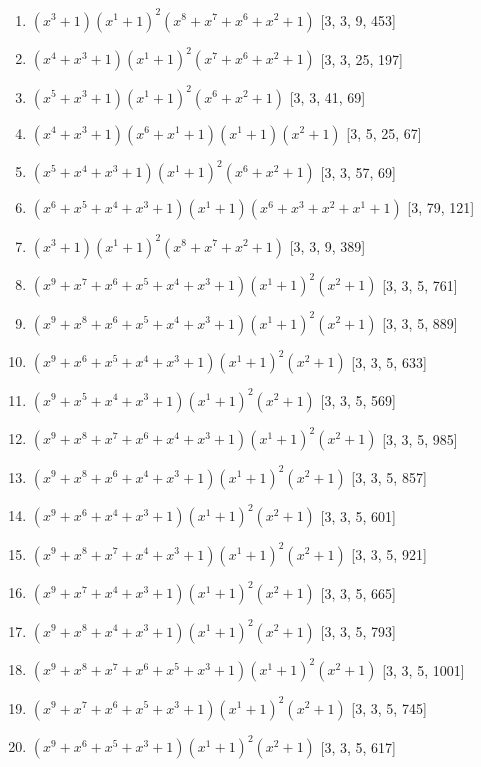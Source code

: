 \documentclass[10pt,twocolumn]{article}
\begin{document}
\begin{enumerate}
\item $(x^{3} + 1)(x^{1} + 1)^{2}(x^{8} + x^{7} + x^{6} + x^{2} + 1)$  [3, 3, 9, 453]
\item $(x^{4} + x^{3} + 1)(x^{1} + 1)^{2}(x^{7} + x^{6} + x^{2} + 1)$  [3, 3, 25, 197]
\item $(x^{5} + x^{3} + 1)(x^{1} + 1)^{2}(x^{6} + x^{2} + 1)$  [3, 3, 41, 69]
\item $(x^{4} + x^{3} + 1)(x^{6} + x^{1} + 1)(x^{1} + 1)(x^{2} + 1)$  [3, 5, 25, 67]
\item $(x^{5} + x^{4} + x^{3} + 1)(x^{1} + 1)^{2}(x^{6} + x^{2} + 1)$  [3, 3, 57, 69]
\item $(x^{6} + x^{5} + x^{4} + x^{3} + 1)(x^{1} + 1)(x^{6} + x^{3} + x^{2} + x^{1} + 1)$  [3, 79, 121]
\item $(x^{3} + 1)(x^{1} + 1)^{2}(x^{8} + x^{7} + x^{2} + 1)$  [3, 3, 9, 389]
\item $(x^{9} + x^{7} + x^{6} + x^{5} + x^{4} + x^{3} + 1)(x^{1} + 1)^{2}(x^{2} + 1)$  [3, 3, 5, 761]
\item $(x^{9} + x^{8} + x^{6} + x^{5} + x^{4} + x^{3} + 1)(x^{1} + 1)^{2}(x^{2} + 1)$  [3, 3, 5, 889]
\item $(x^{9} + x^{6} + x^{5} + x^{4} + x^{3} + 1)(x^{1} + 1)^{2}(x^{2} + 1)$  [3, 3, 5, 633]
\item $(x^{9} + x^{5} + x^{4} + x^{3} + 1)(x^{1} + 1)^{2}(x^{2} + 1)$  [3, 3, 5, 569]
\item $(x^{9} + x^{8} + x^{7} + x^{6} + x^{4} + x^{3} + 1)(x^{1} + 1)^{2}(x^{2} + 1)$  [3, 3, 5, 985]
\item $(x^{9} + x^{8} + x^{6} + x^{4} + x^{3} + 1)(x^{1} + 1)^{2}(x^{2} + 1)$  [3, 3, 5, 857]
\item $(x^{9} + x^{6} + x^{4} + x^{3} + 1)(x^{1} + 1)^{2}(x^{2} + 1)$  [3, 3, 5, 601]
\item $(x^{9} + x^{8} + x^{7} + x^{4} + x^{3} + 1)(x^{1} + 1)^{2}(x^{2} + 1)$  [3, 3, 5, 921]
\item $(x^{9} + x^{7} + x^{4} + x^{3} + 1)(x^{1} + 1)^{2}(x^{2} + 1)$  [3, 3, 5, 665]
\item $(x^{9} + x^{8} + x^{4} + x^{3} + 1)(x^{1} + 1)^{2}(x^{2} + 1)$  [3, 3, 5, 793]
\item $(x^{9} + x^{8} + x^{7} + x^{6} + x^{5} + x^{3} + 1)(x^{1} + 1)^{2}(x^{2} + 1)$  [3, 3, 5, 1001]
\item $(x^{9} + x^{7} + x^{6} + x^{5} + x^{3} + 1)(x^{1} + 1)^{2}(x^{2} + 1)$  [3, 3, 5, 745]
\item $(x^{9} + x^{6} + x^{5} + x^{3} + 1)(x^{1} + 1)^{2}(x^{2} + 1)$  [3, 3, 5, 617]

\end{enumerate}
\end{document}
